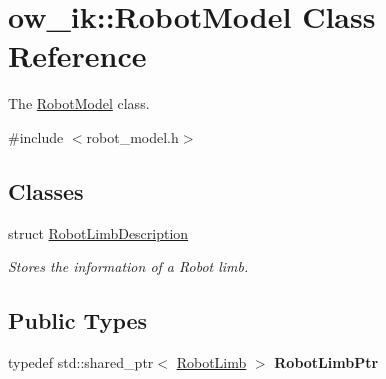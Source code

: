 \hypertarget{classow__ik_1_1RobotModel}{}\section{ow\+\_\+ik\+:\+:Robot\+Model Class Reference}
\label{classow__ik_1_1RobotModel}


The \hyperlink{classow__ik_1_1RobotModel}{Robot\+Model} class.  




{\ttfamily \#include $<$robot\+\_\+model.\+h$>$}

\subsection*{Classes}
\begin{DoxyCompactItemize}
\item 
struct \hyperlink{structow__ik_1_1RobotModel_1_1RobotLimbDescription}{Robot\+Limb\+Description}
\begin{DoxyCompactList}\small\item\em Stores the information of a Robot limb. \end{DoxyCompactList}\end{DoxyCompactItemize}
\subsection*{Public Types}
\begin{DoxyCompactItemize}
\item 
typedef std\+::shared\+\_\+ptr$<$ \hyperlink{classow__ik_1_1RobotLimb}{Robot\+Limb} $>$ {\bfseries Robot\+Limb\+Ptr}\hypertarget{classow__ik_1_1RobotModel_a55f01e8a20999466db16dba0de8b17b7}{}\label{classow__ik_1_1RobotModel_a55f01e8a20999466db16dba0de8b17b7}

\end{DoxyCompactItemize}

